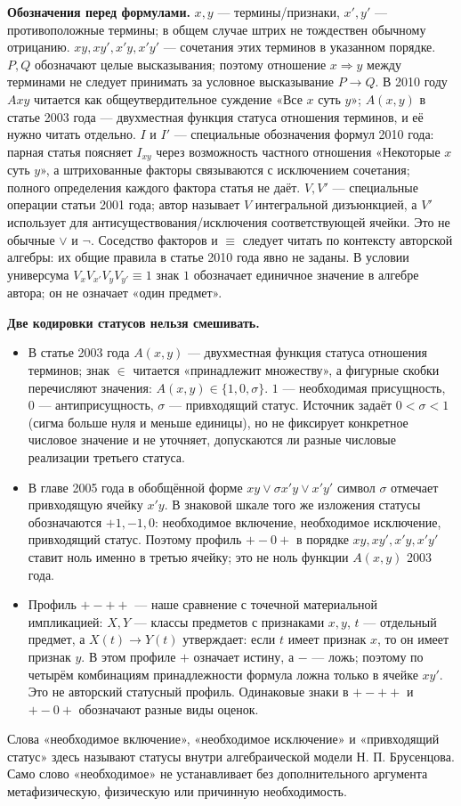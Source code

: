\documentclass[12pt,a4paper]{article}
\begin{document}
\textbf{Обозначения перед формулами.} $x,y$ — термины/признаки, $x',y'$ — противоположные термины; в общем случае штрих не тождествен обычному отрицанию. $xy,xy',x'y,x'y'$ — сочетания этих терминов в указанном порядке. $P,Q$ обозначают целые высказывания; поэтому отношение $x\Rightarrow y$ между терминами не следует принимать за условное высказывание $P\to Q$. В 2010 году $Axy$ читается как общеутвердительное суждение «Все $x$ суть $y$»; $A(x,y)$ в статье 2003 года — двухместная функция статуса отношения терминов, и её нужно читать отдельно. $I$ и $I'$ — специальные обозначения формул 2010 года: парная статья поясняет $I_{xy}$ через возможность частного отношения «Некоторые $x$ суть $y$», а штрихованные факторы связываются с исключением сочетания; полного определения каждого фактора статья не даёт. $V,V'$ — специальные операции статьи 2001 года; автор называет $V$ интегральной дизъюнкцией, а $V'$ использует для антисуществования/исключения соответствующей ячейки. Это не обычные $\lor$ и $\neg$. Соседство факторов и $\equiv$ следует читать по контексту авторской алгебры: их общие правила в статье 2010 года явно не заданы. В условии универсума $V_xV_{x'}V_yV_{y'}\equiv1$ знак $1$ обозначает единичное значение в алгебре автора; он не означает «один предмет».

\textbf{Две кодировки статусов нельзя смешивать.}
\begin{itemize}
\item В статье 2003 года $A(x,y)$ — двухместная функция статуса отношения терминов; знак $\in$ читается «принадлежит множеству», а фигурные скобки перечисляют значения: $A(x,y)\in\{1,0,\sigma\}$. $1$ — необходимая присущность, $0$ — антиприсущность, $\sigma$ — привходящий статус. Источник задаёт $0<\sigma<1$ (сигма больше нуля и меньше единицы), но не фиксирует конкретное числовое значение и не уточняет, допускаются ли разные числовые реализации третьего статуса.
\item В главе 2005 года в обобщённой форме $xy\lor\sigma x'y\lor x'y'$ символ $\sigma$ отмечает привходящую ячейку $x'y$. В знаковой шкале того же изложения статусы обозначаются $+1,-1,0$: необходимое включение, необходимое исключение, привходящий статус. Поэтому профиль $+-0+$ в порядке $xy,xy',x'y,x'y'$ ставит ноль именно в третью ячейку; это не ноль функции $A(x,y)$ 2003 года.
\item Профиль $+-++$ — наше сравнение с точечной материальной импликацией: $X,Y$ — классы предметов с признаками $x,y$, $t$ — отдельный предмет, а $X(t)\to Y(t)$ утверждает: если $t$ имеет признак $x$, то он имеет признак $y$. В этом профиле $+$ означает истину, а $-$ — ложь; поэтому по четырём комбинациям принадлежности формула ложна только в ячейке $xy'$. Это не авторский статусный профиль. Одинаковые знаки в $+-++$ и $+-0+$ обозначают разные виды оценок.
\end{itemize}
Слова «необходимое включение», «необходимое исключение» и «привходящий статус» здесь называют статусы внутри алгебраической модели Н. П. Брусенцова. Само слово «необходимое» не устанавливает без дополнительного аргумента метафизическую, физическую или причинную необходимость.
\end{document}
